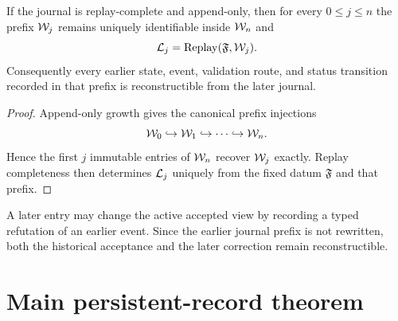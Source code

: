 \begin{theorem}
If the journal is replay-complete and append-only, then for every $0\le j\le n$ the prefix $\mathcal W_j$ remains uniquely identifiable inside $\mathcal W_n$ and
\begin{equation}
\mathcal L_j=\operatorname{Replay}(\mathfrak F,\mathcal W_j).
\label{eq:replay}
\end{equation}
Consequently every earlier state, event, validation route, and status transition recorded in that prefix is reconstructible from the later journal.
\end{theorem}

\begin{proof}
Append-only growth gives the canonical prefix injections
\[
\mathcal W_0\hookrightarrow\mathcal W_1\hookrightarrow\cdots\hookrightarrow\mathcal W_n.
\]
Hence the first $j$ immutable entries of $\mathcal W_n$ recover $\mathcal W_j$ exactly. Replay completeness then determines $\mathcal L_j$ uniquely from the fixed datum $\mathfrak F$ and that prefix.
\end{proof}

\begin{corollary}
A later entry may change the active accepted view by recording a typed refutation of an earlier event. Since the earlier journal prefix is not rewritten, both the historical acceptance and the later correction remain reconstructible.
\end{corollary}

\section{Main persistent-record theorem}

